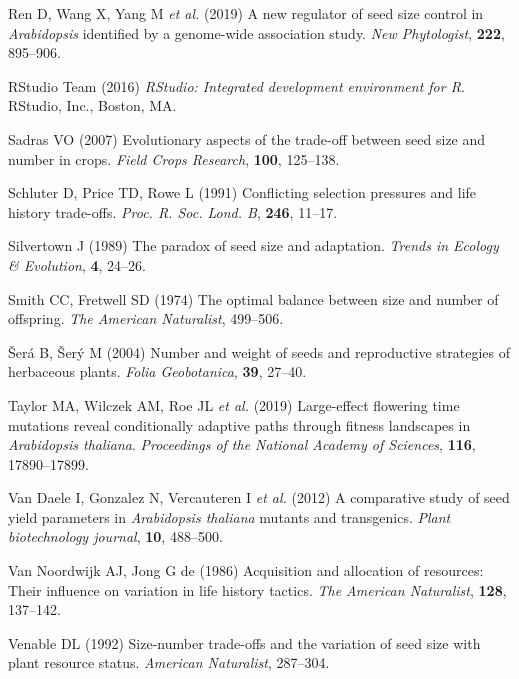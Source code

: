 \documentclass[]{article}
\begin{document}
\leavevmode\hypertarget{ref-ren2019new}{}%
Ren D, Wang X, Yang M \emph{et al.} (2019) A new regulator of seed size control in \emph{Arabidopsis} identified by a genome-wide association study. \emph{New Phytologist}, \textbf{222}, 895--906.

\leavevmode\hypertarget{ref-RStudioTeam2015}{}%
RStudio Team (2016) \emph{RStudio: Integrated development environment for R}. RStudio, Inc., Boston, MA.

\leavevmode\hypertarget{ref-Sadras2007}{}%
Sadras VO (2007) Evolutionary aspects of the trade-off between seed size and number in crops. \emph{Field Crops Research}, \textbf{100}, 125--138.

\leavevmode\hypertarget{ref-schluter1991conflicting}{}%
Schluter D, Price TD, Rowe L (1991) Conflicting selection pressures and life history trade-offs. \emph{Proc. R. Soc. Lond. B}, \textbf{246}, 11--17.

\leavevmode\hypertarget{ref-Silvertown1989}{}%
Silvertown J (1989) The paradox of seed size and adaptation. \emph{Trends in Ecology \& Evolution}, \textbf{4}, 24--26.

\leavevmode\hypertarget{ref-Smith1974}{}%
Smith CC, Fretwell SD (1974) The optimal balance between size and number of offspring. \emph{The American Naturalist}, 499--506.

\leavevmode\hypertarget{ref-Sera2004}{}%
Šerá B, Šerý M (2004) Number and weight of seeds and reproductive strategies of herbaceous plants. \emph{Folia Geobotanica}, \textbf{39}, 27--40.

\leavevmode\hypertarget{ref-taylor2019large}{}%
Taylor MA, Wilczek AM, Roe JL \emph{et al.} (2019) Large-effect flowering time mutations reveal conditionally adaptive paths through fitness landscapes in \emph{Arabidopsis thaliana}. \emph{Proceedings of the National Academy of Sciences}, \textbf{116}, 17890--17899.

\leavevmode\hypertarget{ref-van2012comparative}{}%
Van Daele I, Gonzalez N, Vercauteren I \emph{et al.} (2012) A comparative study of seed yield parameters in \emph{Arabidopsis thaliana} mutants and transgenics. \emph{Plant biotechnology journal}, \textbf{10}, 488--500.

\leavevmode\hypertarget{ref-VanNoordwijk1986}{}%
Van Noordwijk AJ, Jong G de (1986) Acquisition and allocation of resources: Their influence on variation in life history tactics. \emph{The American Naturalist}, \textbf{128}, 137--142.

\leavevmode\hypertarget{ref-Venable1992}{}%
Venable DL (1992) Size-number trade-offs and the variation of seed size with plant resource status. \emph{American Naturalist}, 287--304.
\end{document}
